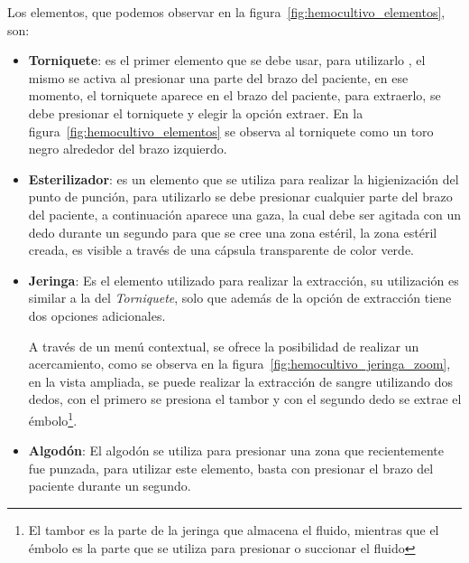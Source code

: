 Los elementos, que podemos observar en la
figura~\ref{fig:hemocultivo_elementos}, son:

\begin{itemize}
\item \textbf{Torniquete}: es el primer elemento que se debe usar, para utilizarlo
    , el mismo se activa al presionar una parte del brazo del paciente,
    en ese momento, el torniquete aparece en el brazo del paciente, para
    extraerlo, se debe presionar el torniquete y elegir la opción extraer. En la
    figura~\ref{fig:hemocultivo_elementos} se observa al torniquete como un toro
    negro alrededor del brazo izquierdo.

\item \textbf{Esterilizador}: es un elemento que se utiliza para realizar la
    higienización del punto de punción, para utilizarlo se debe presionar
    cualquier parte del brazo del paciente, a continuación aparece una gaza, la
    cual debe ser agitada con un dedo durante un segundo para que se cree una
    zona estéril, la zona estéril creada, es visible a través de una cápsula
     transparente de color verde.

\item \textbf{Jeringa}: Es el elemento utilizado para realizar la extracción, su
    utilización es similar a la del \emph{Torniquete}, solo que además de la
    opción de extracción tiene dos opciones adicionales.

    A través de un menú contextual, se ofrece la posibilidad de realizar un
    acercamiento, como se observa en la
    figura~\ref{fig:hemocultivo_jeringa_zoom}, en la vista ampliada, se puede
    realizar la extracción de sangre utilizando dos dedos, con el primero se
    presiona el tambor y con el segundo dedo se extrae el émbolo\footnote{El
        tambor es la parte de la jeringa que almacena el fluido, mientras que el
        émbolo es la parte que se utiliza para presionar o succionar el fluido}.
    
\item \textbf{Algodón}: El algodón se utiliza para presionar una zona que
    recientemente fue punzada, para utilizar este elemento, basta con presionar
    el brazo del paciente durante un segundo.

\end{itemize}


